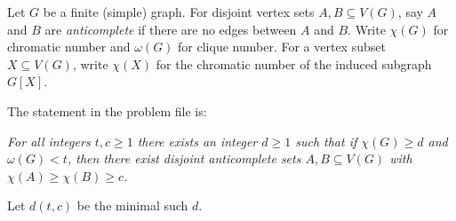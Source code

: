 Let $G$ be a finite (simple) graph.
For disjoint vertex sets $A,B\subseteq V(G)$, say $A$ and $B$ are \emph{anticomplete} if there are no edges between $A$ and $B$.
Write $\chi(G)$ for chromatic number and $\omega(G)$ for clique number.
For a vertex subset $X\subseteq V(G)$, write $\chi(X)$ for the chromatic number of the induced subgraph $G[X]$.

The statement in the problem file is:

\emph{For all integers $t,c\ge 1$ there exists an integer $d\ge 1$ such that if $\chi(G)\ge d$ and $\omega(G)<t$, then there exist disjoint anticomplete sets $A,B\subseteq V(G)$ with $\chi(A)\ge \chi(B)\ge c$.}

Let $d(t,c)$ be the minimal such $d$.
